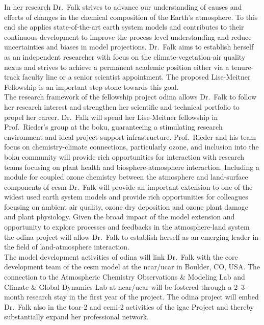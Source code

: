 %
\vspace{0.5\baselineskip}
In her research Dr.~Falk strives to advance our understanding of causes and effects of changes in the chemical composition of the Earth’s atmosphere. To this end she applies state-of-the-art earth system models and contributes to their continuous development to improve the process level understanding and reduce uncertainties and biases in model projections. Dr.~Falk aims to establish herself as an independent researcher with focus on the climate-vegetation-air quality nexus and strives to achieve a permanent academic position either via a tenure-track faculty line or a senior scientist appointment. The proposed Lise-Meitner Fellowship is an important step stone towards this goal.\\

The research framework of the fellowship project \gls{odina} allows Dr.~Falk to follow her research interest and strengthen her scientific and technical portfolio to propel her career. Dr.~Falk will spend her Lise-Meitner fellowship in Prof.~Rieder’s group at the \gls{boku}, guaranteeing a stimulating research environment and ideal project support infrastructure. Prof.~Rieder and his team focus on chemistry-climate connections, particularly ozone, and inclusion into the \gls{boku} community will provide rich opportunities for interaction with research teams focusing on plant health and biosphere-atmosphere interaction. Including a module for coupled ozone chemistry between the atmosphere and land-surface components of \gls{cesm} Dr.~Falk will provide an important extension to one of the widest used earth system models and provide rich opportunities for colleagues focusing on ambient air quality, ozone dry deposition and ozone plant damage and plant physiology. Given the broad impact of the model extension and opportunity to explore processes and feedbacks in the atmosphere-land system the \gls{odina} project will allow Dr.~Falk to establish herself as an emerging leader in the field of land-atmosphere interaction.\\

The model development activities of \gls{odina} will link Dr.~Falk with the core development team of the \gls{cesm} model at the \gls{ncar/ucar} in Boulder, CO, USA. The connection to the Atmospheric Chemistry Observations \& Modeling Lab and Climate \& Global Dynamics Lab at \gls{ncar/ucar} will be fostered through a 2--3-month research stay in the first year of the project. The \gls{odina} project will embed Dr.~Falk also in the \gls{toar}-2 and \gls{ccmi}-2 activities of the \gls{igac} Project and thereby substantially expand her professional network.\\

